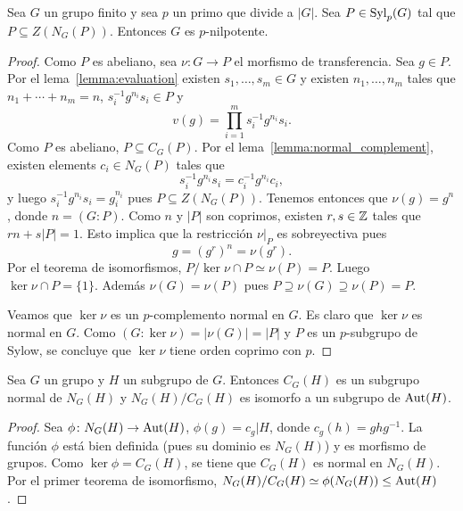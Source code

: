 \begin{theorem}[Burnside]
	\label{theorem:Burnside:normal_complement}
	Sea $G$ un grupo finito y sea $p$ un primo que divide a $|G|$. Sea
	$P\in\mathrm{Syl}_p(G)$ tal que $P\subseteq Z(N_G(P))$. Entonces $G$ es
	$p$-nilpotente.
\end{theorem}

\begin{proof}
	Como $P$ es abeliano, sea $\nu\colon G\to P$ el morfismo de transferencia.
	Sea $g\in P$.  Por el lema~\ref{lemma:evaluation} existen $s_1,\dots,s_m\in
	G$ y existen $n_1,\dots,n_m$ tales que $n_1+\cdots+n_m=n$,
	$s_i^{-1}g^{n_i}s_i\in P$ y 
	\[
		v(g)=\prod_{i=1}^m s_i^{-1}g^{n_i}s_i.
	\]
	Como $P$ es abeliano, $P\subseteq C_G(P)$. Por 
	el lema~\ref{lemma:normal_complement}, existen elements $c_i\in N_G(P)$ tales 
	que 
	\[
	s_i^{-1}g^{n_i}s_i=c_i^{-1}g^{n_i}c_i,
	\]
	y luego $s_i^{-1}g^{n_i}s_i=g_i^{n_i}$ pues $P\subseteq Z(N_G(P))$. Tenemos
	entonces que $\nu(g)=g^n$, donde $n=(G:P)$. Como $n$ y $|P|$ son coprimos,
	existen $r,s\in\mathbb{Z}$ tales que $rn+s|P|=1$. Esto implica que la restricción
	$\nu|_P$ es
	sobreyectiva pues
	\[
	g=(g^r)^n=\nu(g^r).
	\]
	Por el teorema de isomorfismos, $P/\ker\nu\cap P\simeq\nu(P)=P$. 
	Luego $\ker\nu\cap P=\{1\}$. Además $\nu(G)=\nu(P)$ pues 
	$P\supseteq \nu(G)\supseteq \nu(P)=P$.
	
	Veamos que $\ker\nu$ es un $p$-complemento normal en $G$. Es claro que $\ker\nu$ es normal en $G$. 
	Como $(G:\ker\nu)=|\nu(G)|=|P|$ y $P$ es un $p$-subgrupo de Sylow, se concluye que $\ker\nu$ tiene orden coprimo con $p$.
\end{proof}



\begin{lemma}
	\label{lemma:NC}
	Sea $G$ un grupo y $H$ un subgrupo de $G$. Entonces $C_G(H)$ es un subgrupo
	normal de $N_G(H)$ y $N_G(H)/C_G(H)$ es isomorfo a un subgrupo de
	$\operatorname{Aut}(H)$.
\end{lemma}

\begin{proof}
	Sea $\phi\colon N_G(H)\to\operatorname{Aut}(H)$,  $\phi(g)=c_g|H$, donde
	$c_g(h)=ghg^{-1}$.  La función $\phi$ está bien definida (pues su dominio
	es $N_G(H)$) y es morfismo de grupos. Como $\ker\phi=C_G(H)$, se tiene que
	$C_G(H)$ es normal en $N_G(H)$. Por el primer teorema de isomorfismo,
	$N_G(H)/C_G(H)\simeq\phi(N_G(H))\leq\operatorname{Aut}(H)$.
\end{proof}

